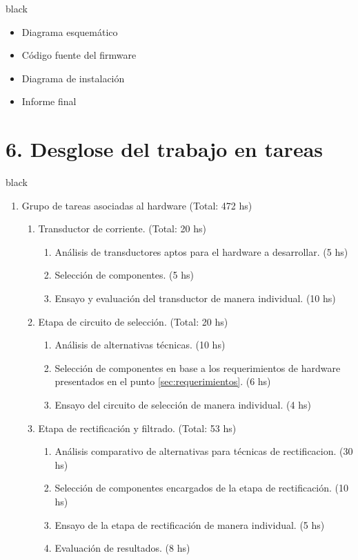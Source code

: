 \documentclass[11pt]{charter}
\begin{document}
\begin{consigna}{black}
\begin{itemize}
\item Diagrama esquemático
\item Código fuente del firmware 
\item Diagrama de instalación
\item Informe final

\end{itemize}

\end{consigna}

\section{6. Desglose del trabajo en tareas}
\label{sec:wbs}
\begin{consigna}{black}
\begin{enumerate}
\item Grupo de tareas asociadas al hardware (Total: 472 hs)
	\begin{enumerate}
			 \item Transductor de corriente. (Total: 20 hs)
			 \begin{enumerate}
			 	\item Análisis de transductores aptos para el hardware a desarrollar. (5 hs)
			 	\item Selección de componentes. (5 hs)
			 	\item Ensayo y evaluación del transductor de manera individual. (10 hs)
			 \end{enumerate}
			
			 \item Etapa de circuito de selección. (Total: 20 hs)
			 \begin{enumerate}
			 	\item Análisis de alternativas técnicas. (10 hs)
			 	\item Selección de componentes en base a los requerimientos de hardware presentados en el punto \ref{sec:requerimientos}. (6 hs)
			 	\item Ensayo del circuito de selección de manera individual. (4 hs)
			 \end{enumerate}			
			
			 \item Etapa de rectificación y filtrado. (Total: 53 hs)
			 \begin{enumerate}
				\item Análisis comparativo de alternativas para técnicas de rectificacion. (30 hs)
				\item Selección de componentes encargados de la etapa de rectificación. (10 hs)
				\item Ensayo de la etapa de rectificación de manera individual. (5 hs)
				\item Evaluación de resultados. (8 hs)
			 \end{enumerate}
			

\end{enumerate}
\end{enumerate}
\end{consigna}
\end{document}
